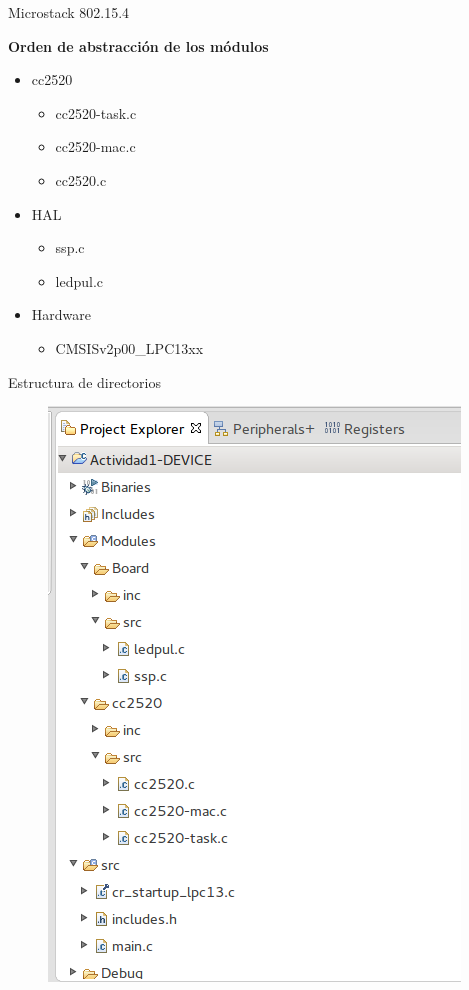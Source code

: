 \documentclass[aspectratio=169]{beamer}
\begin{document}
\begin{frame}[t]{Microstack 802.15.4}

\textbf{Orden de abstracción de los módulos}
\vspace{10px}
	\begin{itemize}
	\item cc2520
		\begin{itemize}
			\item cc2520-task.c
			\item cc2520-mac.c
			\item cc2520.c
		\end{itemize}	
	\vspace{10px}
	\item HAL
		\begin{itemize}
			\item ssp.c
			\item ledpul.c
		\end{itemize}
	\vspace{10px}
	\item Hardware
		\begin{itemize}
			\item CMSISv2p00{\_}LPC13xx
		\end{itemize}
	\end{itemize}
\end{frame}

\begin{frame}[t]{Estructura de directorios}
\vspace{-10px}
	\begin{figure}[H]
		\includegraphics[height=\textheight]{./imagenes/ProjectExplorer}
	\end{figure}
\end{frame}
\end{document}

